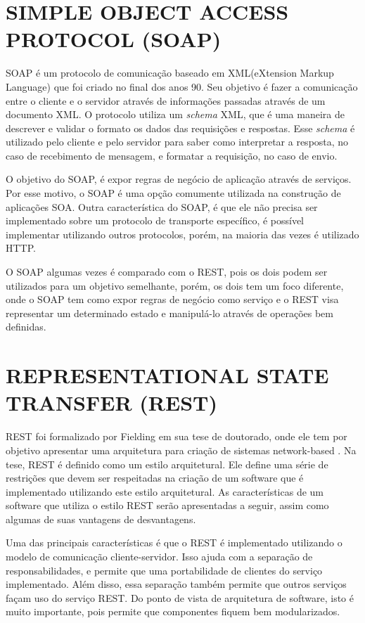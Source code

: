 \section{SIMPLE OBJECT ACCESS PROTOCOL (SOAP)}
SOAP é um protocolo de comunicação baseado em XML(eXtension Markup Language) que foi criado no final 
dos anos 90. Seu objetivo é fazer a comunicação entre o cliente e o servidor através de informações 
passadas através de um documento XML. O protocolo utiliza um \textit{schema} XML, que é uma 
maneira de descrever e validar o formato os dados das requisições e respostas. 
Esse \textit{schema} é utilizado pelo cliente e pelo servidor para saber como interpretar a resposta, 
no caso de recebimento de mensagem, e formatar a requisição, no caso de envio.

O objetivo do SOAP, é expor regras de negócio de aplicação através de serviços. 
Por esse motivo, o SOAP é uma opção comumente utilizada na construção de aplicações SOA. 
Outra característica do SOAP, é que ele não precisa ser implementado sobre um protocolo de 
transporte específico, é possível implementar utilizando outros protocolos, porém, 
na maioria das vezes é utilizado HTTP.

O SOAP algumas vezes é comparado com o REST, pois os dois podem ser utilizados para um objetivo 
semelhante, porém, os dois tem um foco diferente, onde o SOAP tem como expor regras de negócio 
como serviço e o REST visa representar um determinado estado e manipulá-lo através de operações 
bem definidas.

\section{REPRESENTATIONAL STATE TRANSFER (REST)}
REST foi formalizado por Fielding \cite{fielding} em sua tese de doutorado, onde ele tem por 
objetivo apresentar uma arquitetura para criação de sistemas network-based . 
Na tese, REST é definido como um estilo arquitetural. Ele define uma série de restrições que devem ser 
respeitadas na criação de um software que é implementado utilizando este estilo arquitetural. 
As características de um software que utiliza o estilo REST serão apresentadas a seguir, assim 
como algumas de suas vantagens de desvantagens.

Uma das principais características é que o REST é implementado utilizando o modelo de comunicação 
cliente-servidor. Isso ajuda com a separação de responsabilidades, e permite que uma portabilidade 
de clientes do serviço implementado. Além disso, essa separação também permite que outros serviços 
façam uso do serviço REST. Do ponto de vista de arquitetura de software, isto é muito importante, 
pois permite que componentes fiquem bem modularizados.

